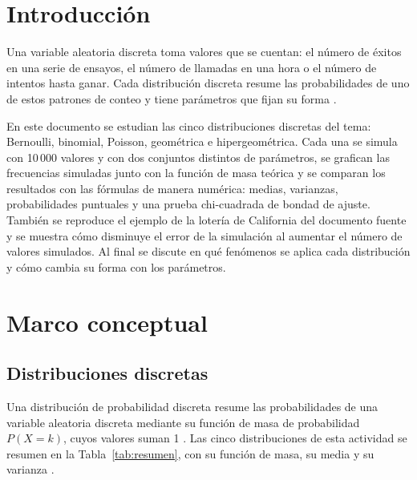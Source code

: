 \documentclass[11pt,letterpaper]{article}
\begin{document}
\portada
\indicegeneral


\section{Introducción}

Una variable aleatoria discreta toma valores que se cuentan: el número de éxitos en una serie de ensayos, el número de llamadas en una hora o el número de intentos hasta ganar. Cada distribución discreta resume las probabilidades de uno de estos patrones de conteo y tiene parámetros que fijan su forma \parencite{tecnm2026_documento_fuente,brownlee2020}.

En este documento se estudian las cinco distribuciones discretas del tema: Bernoulli, binomial, Poisson, geométrica e hipergeométrica. Cada una se simula con 10\,000 valores y con dos conjuntos distintos de parámetros, se grafican las frecuencias simuladas junto con la función de masa teórica y se comparan los resultados con las fórmulas de manera numérica: medias, varianzas, probabilidades puntuales y una prueba chi-cuadrada de bondad de ajuste. También se reproduce el ejemplo de la lotería de California del documento fuente y se muestra cómo disminuye el error de la simulación al aumentar el número de valores simulados. Al final se discute en qué fenómenos se aplica cada distribución y cómo cambia su forma con los parámetros.

\section{Marco conceptual}

\subsection{Distribuciones discretas}

Una distribución de probabilidad discreta resume las probabilidades de una variable aleatoria discreta mediante su función de masa de probabilidad $P(X = k)$, cuyos valores suman 1 \parencite{tecnm2026_documento_fuente}. Las cinco distribuciones de esta actividad se resumen en la Tabla~\ref{tab:resumen}, con su función de masa, su media y su varianza \parencite{tecnm2026_documento_fuente,rice2006}.
\end{document}
